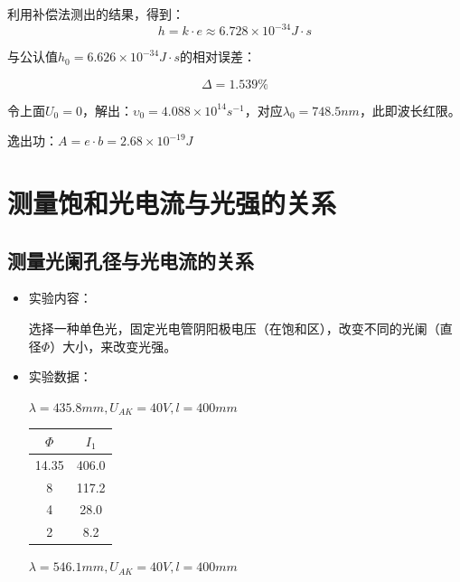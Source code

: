 \documentclass[a4paper]{ltxdoc}
\newenvironment{Figure}
  {\par\medskip\noindent\minipage{\linewidth}}
  {\endminipage\par\medskip}
\begin{document}
\begin{multicols}{2}
\begin{itemize}
              利用补偿法测出的结果，得到：
              $$
                  h= k \cdot e \approx 6.728 \times 10^{-34} J\cdot s
              $$

              与公认值$h_0 = 6.626 \times 10^{-34} J\cdot s$的相对误差：

              $$\Delta = 1.539\%$$

              令上面$U_0 =0$，解出：$\upsilon _0 = 4.088 \times 10^{14} s^{-1}$，对应$\lambda_0 = 748.5 nm$，此即波长红限。

              逸出功：$A=e\cdot b=2.68\times 10^{-19} J$
    \end{itemize}
    \section{测量饱和光电流与光强的关系}
    \subsection{测量光阑孔径与光电流的关系}
    \begin{itemize}
        \item 实验内容：

              选择一种单色光，固定光电管阴阳极电压（在饱和区），改变不同的光阑（直径$\Phi$）大小，来改变光强。

        \item 实验数据：

              \smallskip
              \begin{Figure}
                  \centering
                  $\lambda = 435.8 mm,U_{AK} = 40 V, l =400mm$

                  \smallskip
                  \begin{tabular}{|c|c|}
                      \hline $\Phi$ & $I_1$ \\
                      \hline 14.35  & 406.0 \\
                      \hline 8      & 117.2 \\
                      \hline 4      & 28.0  \\
                      \hline 2      & 8.2   \\
                      \hline
                  \end{tabular}
              \end{Figure}
              \begin{Figure}
                  \centering
                  $\lambda = 546.1 mm,U_{AK} = 40 V, l =400mm$


\end{Figure}
\end{itemize}
\end{multicols}
\end{document}
